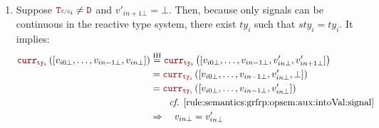 \begin{skippableproof}
\begin{itemize}
\begin{enumerate}
\begin{align*}
                                      & \qquad \text{\cf \Cref{rule:semantics:grfrp:opsem:aux:intoVal:signal}}       \\
                                      & = v_{in},
                        \end{align*}
                        and, if there exist $ty_i$ such that $sty_i = \mayB{ty_i}$ (\ie is an event type):
                        \begin{align*}
                            v'_{in+1} & = \intoVal{\mayB{ty_i}}{v'_{in}}{v'_{in+1\bot}}                       \\
                                      & = \intoVal{\mayB{ty_i}}{\_}{v_{in\bot}}                               \\
                                      & = \intoVal{\mayB{ty_i}}{v_{in}^{\explast}}{v_{in\bot}}                \\
                                      & \qquad \text{\cf \Cref{rule:semantics:grfrp:opsem:aux:intoVal:event}} \\
                                      & = v_{in}.
                        \end{align*}
                  \item Suppose $\rType_i \neq \dType$ and $v'_{in+1\bot} = \bot$. Then, because
                        only signals can be continuous in the reactive type system, there exist
                        $ty_i$ such that $sty_i = ty_i$. It implies:
                        \begin{align*}
                            \CurrVal{ty_i}{[v_{i0\bot}, \dots, v_{in-1\bot}, v_{in\bot}]} & \myeq{IH} \CurrVal{ty_i}{[v_{i0\bot}, \dots, v_{in-1\bot}, v'_{in\bot}, v'_{in+1\bot}]} \\
                                                                                          & = \CurrVal{ty_i}{[v_{i0\bot}, \dots, v_{in-1\bot}, v'_{in\bot}, \bot]}                  \\
                                                                                          & = \CurrVal{ty_i}{[v_{i0\bot}, \dots, v_{in-1\bot}, v'_{in\bot}]}                        \\
                                                                                          & \qquad \text{\cf \Cref{rule:semantics:grfrp:opsem:aux:intoVal:signal}}                  \\
                                                                                          & \Rightarrow \quad v_{in\bot} = v'_{in\bot}                                              \\

\end{align*}
\end{enumerate}
\end{itemize}
\end{skippableproof}
